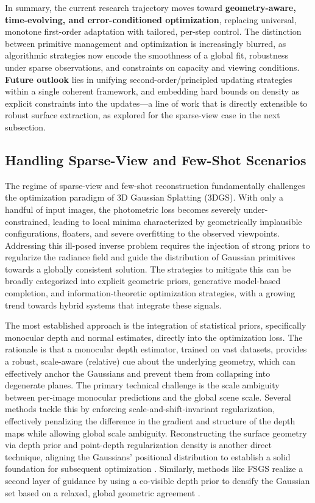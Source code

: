 \documentclass[11pt,a4paper]{article}
\begin{document}
In summary, the current research trajectory moves toward \textbf{geometry-aware, time-evolving, and error-conditioned optimization}, replacing universal, monotone first-order adaptation with tailored, per-step control. The distinction between primitive management and optimization is increasingly blurred, as algorithmic strategies now encode the smoothness of a global fit, robustness under sparse observations, and constraints on capacity and viewing conditions. \textbf{Future outlook} lies in unifying second-order/principled updating strategies within a single coherent framework, and embedding hard bounds on density as explicit constraints into the updates---a line of work that is directly extensible to robust surface extraction, as explored for the sparse-view case in the next subsection.


\subsection{Handling Sparse-View and Few-Shot Scenarios}


\cite{arxiv:2405.03650v2}
The regime of sparse-view and few-shot reconstruction fundamentally challenges the optimization paradigm of 3D Gaussian Splatting (3DGS). With only a handful of input images, the photometric loss becomes severely under-constrained, leading to local minima characterized by geometrically implausible configurations, floaters, and severe overfitting to the observed viewpoints. Addressing this ill-posed inverse problem requires the injection of strong priors to regularize the radiance field and guide the distribution of Gaussian primitives towards a globally consistent solution. The strategies to mitigate this can be broadly categorized into explicit geometric priors, generative model-based completion, and information-theoretic optimization strategies, with a growing trend towards hybrid systems that integrate these signals.

The most established approach is the integration of statistical priors, specifically monocular depth and normal estimates, directly into the optimization loss. The rationale is that a monocular depth estimator, trained on vast datasets, provides a robust, scale-aware (relative) cue about the underlying geometry, which can effectively anchor the Gaussians and prevent them from collapsing into degenerate planes. The primary technical challenge is the scale ambiguity between per-image monocular predictions and the global scene scale. Several methods \cite{arxiv:2510.10257v1,arxiv:2505.20729v1} tackle this by enforcing scale-and-shift-invariant regularization, effectively penalizing the difference in the gradient and structure of the depth maps while allowing global scale ambiguity. Reconstructing the surface geometry via depth prior and point-depth regularization density is another direct technique, aligning the Gaussians' positional distribution to establish a solid foundation for subsequent optimization \cite{arxiv:2403.17898v1}. Similarly, methods like FSGS realize a second layer of guidance by using a co-visible depth prior to densify the Gaussian set based on a relaxed, global geometric agreement \cite{arxiv:2411.03637v1}.
\end{document}
